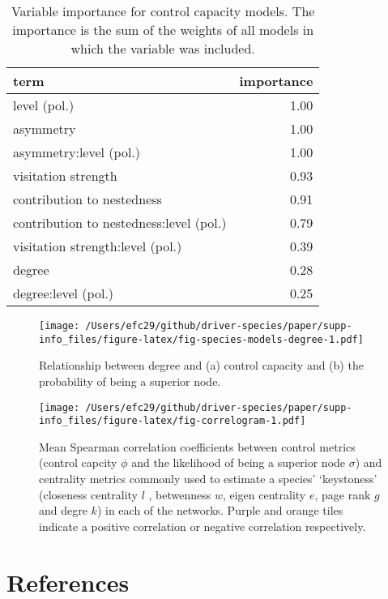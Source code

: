 \documentclass[a4paper]{artikel1}
\theoremstyle{definition}
\theoremstyle{definition}
\theoremstyle{definition}
\theoremstyle{remark}
\begin{document}
\begin{table}

\caption{\label{tab:tab-var-importance}Variable importance for control capacity models. The importance is the sum of the weights of all models in which the variable was included.}
\centering
\fontsize{8}{10}\selectfont
\begin{tabular}[t]{lr}
\toprule
term & importance\\
\midrule
level (pol.) & 1.00\\
asymmetry & 1.00\\
asymmetry:level (pol.) & 1.00\\
visitation strength & 0.93\\
contribution to nestedness & 0.91\\
contribution to nestedness:level (pol.) & 0.79\\
visitation strength:level (pol.) & 0.39\\
degree & 0.28\\
degree:level (pol.) & 0.25\\
\bottomrule
\end{tabular}
\end{table}

\begin{figure}
\centering
\texttt{[image: /Users/efc29/github/driver-species/paper/supp-info\_files/figure-latex/fig-species-models-degree-1.pdf]}
\caption{\label{fig:fig-species-models-degree}Relationship between degree
and (a) control capacity and (b) the probability of being a superior
node.}
\end{figure}

\begin{figure}
\centering
\texttt{[image: /Users/efc29/github/driver-species/paper/supp-info\_files/figure-latex/fig-correlogram-1.pdf]}
\caption{\label{fig:fig-correlogram}Mean Spearman correlation coefficients
between control metrics (control capcity \(\phi\) and the likelihood of
being a superior node \(\sigma\)) and centrality metrics commonly used
to estimate a species' `keystoness' (closeness centrality \(l\) ,
betwenness \(w\), eigen centrality \(e\), page rank \(g\) and degre
\(k\)) in each of the networks. Purple and orange tiles indicate a
positive correlation or negative correlation respectively.}
\end{figure}

\clearpage 

\section*{References}\label{references}
\end{document}
